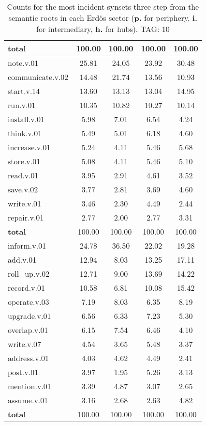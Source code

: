 \begin{table}[h!]
\begin{center}
\begin{tabular}{| l || c | c | c | c |}
{{\bf total}} & 100.00  & 100.00  & 100.00  & 100.00 \\\hline\hline\hline
note.v.01 & 25.81  & 24.05  & 23.92  & 30.48 \\\hline
communicate.v.02 & 14.48  & 21.74  & 13.56  & 10.93 \\\hline
start.v.14 & 13.60  & 13.13  & 13.04  & 14.95 \\\hline
run.v.01 & 10.35  & 10.82  & 10.27  & 10.14 \\\hline
install.v.01 & 5.98  & 7.01  & 6.54  & 4.24 \\\hline
think.v.01 & 5.49  & 5.01  & 6.18  & 4.60 \\\hline
increase.v.01 & 5.24  & 4.11  & 5.46  & 5.68 \\\hline
store.v.01 & 5.08  & 4.11  & 5.46  & 5.10 \\\hline
read.v.01 & 3.95  & 2.91  & 4.61  & 3.52 \\\hline
save.v.02 & 3.77  & 2.81  & 3.69  & 4.60 \\\hline
write.v.01 & 3.46  & 2.30  & 4.49  & 2.44 \\\hline
repair.v.01 & 2.77  & 2.00  & 2.77  & 3.31 \\\hline\hline
{{\bf total}} & 100.00  & 100.00  & 100.00  & 100.00 \\\hline\hline\hline
inform.v.01 & 24.78  & 36.50  & 22.02  & 19.28 \\\hline
add.v.01 & 12.94  & 8.03  & 13.25  & 17.11 \\\hline
roll\_up.v.02 & 12.71  & 9.00  & 13.69  & 14.22 \\\hline
record.v.01 & 10.58  & 6.81  & 10.08  & 15.42 \\\hline
operate.v.03 & 7.19  & 8.03  & 6.35  & 8.19 \\\hline
upgrade.v.01 & 6.56  & 6.33  & 7.23  & 5.30 \\\hline
overlap.v.01 & 6.15  & 7.54  & 6.46  & 4.10 \\\hline
write.v.07 & 4.54  & 3.65  & 5.48  & 3.37 \\\hline
address.v.01 & 4.03  & 4.62  & 4.49  & 2.41 \\\hline
post.v.01 & 3.97  & 1.95  & 5.26  & 3.13 \\\hline
mention.v.01 & 3.39  & 4.87  & 3.07  & 2.65 \\\hline
assume.v.01 & 3.16  & 2.68  & 2.63  & 4.82 \\\hline\hline
{{\bf total}} & 100.00  & 100.00  & 100.00  & 100.00 \\\hline
\end{tabular}
\caption{Counts for the most incident synsets three step from the semantic roots in each Erd\"os sector ({\bf p.} for periphery, {\bf i.} for intermediary, {\bf h.} for hubs). TAG: 10}
\end{center}
\end{table}